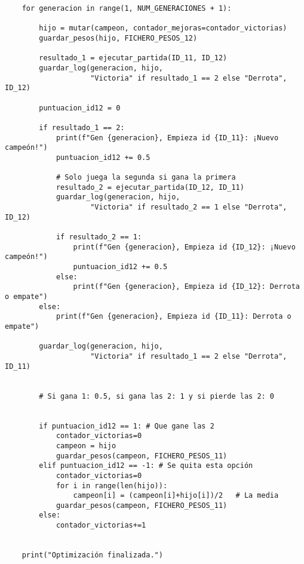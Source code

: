 \documentclass[12pt]{article}
\begin{document}
\begin{verbatim}
    for generacion in range(1, NUM_GENERACIONES + 1):

        hijo = mutar(campeon, contador_mejoras=contador_victorias)
        guardar_pesos(hijo, FICHERO_PESOS_12)

        resultado_1 = ejecutar_partida(ID_11, ID_12)
        guardar_log(generacion, hijo, 
                    "Victoria" if resultado_1 == 2 else "Derrota", ID_12)

        puntuacion_id12 = 0

        if resultado_1 == 2:
            print(f"Gen {generacion}, Empieza id {ID_11}: ¡Nuevo campeón!")
            puntuacion_id12 += 0.5

            # Solo juega la segunda si gana la primera
            resultado_2 = ejecutar_partida(ID_12, ID_11)
            guardar_log(generacion, hijo, 
                    "Victoria" if resultado_2 == 1 else "Derrota", ID_12)

            if resultado_2 == 1:
                print(f"Gen {generacion}, Empieza id {ID_12}: ¡Nuevo campeón!")
                puntuacion_id12 += 0.5
            else:
                print(f"Gen {generacion}, Empieza id {ID_12}: Derrota o empate")
        else:
            print(f"Gen {generacion}, Empieza id {ID_11}: Derrota o empate")

        guardar_log(generacion, hijo, 
                    "Victoria" if resultado_1 == 2 else "Derrota", ID_11)


        # Si gana 1: 0.5, si gana las 2: 1 y si pierde las 2: 0


        if puntuacion_id12 == 1: # Que gane las 2
            contador_victorias=0
            campeon = hijo
            guardar_pesos(campeon, FICHERO_PESOS_11)
        elif puntuacion_id12 == -1: # Se quita esta opción
            contador_victorias=0
            for i in range(len(hijo)):
                campeon[i] = (campeon[i]+hijo[i])/2   # La media
            guardar_pesos(campeon, FICHERO_PESOS_11)            
        else:
            contador_victorias+=1
            

    print("Optimización finalizada.")

    \end{verbatim}
\end{document}

